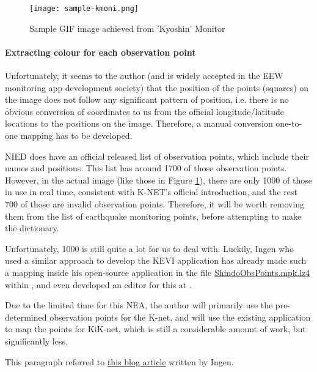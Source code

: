 \begin{figure}[!ht]
    \centering
    \texttt{[image: sample-kmoni.png]}
    \caption{Sample GIF image achieved from 'Kyoshin' Monitor}
    \label{fig:sample-kmoni}
\end{figure}

\paragraph{Extracting colour for each observation point}

Unfortunately, it seems to the author (and is widely accepted in the EEW monitoring app development society) that the position of the points (squares) on the image does not follow any significant pattern of position, i.e. there is no obvious conversion of coordinates to us from the official longitude/latitude locations to the positions on the image. Therefore, a manual conversion one-to-one mapping has to be developed.

NIED does have an official released list of observation points, which include their names and positions. This list has around 1700 of those observation points. However, in the actual image (like those in Figure \ref{fig:sample-kmoni}), there are only 1000 of those in use in real time, consistent with K-NET's official introduction, and the rest 700 of those are invalid observation points. Therefore, it will be worth removing them from the list of earthquake monitoring points, before attempting to make the dictionary.

Unfortunately, 1000 is still quite a lot for us to deal with. Luckily, Ingen who used a similar approach to develop the KEVI application has already made such a mapping inside his open-source application in the file \href{https://github.com/ingen084/KyoshinEewViewerIngen/blob/develop/src/KyoshinEewViewer/Assets/ShindoObsPoints.mpk.lz4}{ShindoObsPoints.mpk.lz4} within , and even developed an editor for this at .

Due to the limited time for this NEA, the author will primarily use the pre-determined observation points for the K-net, and will use the existing application to map the points for KiK-net, which is still a considerable amount of work, but significantly less.

This paragraph referred to \href{https://qiita.com/ingen084/items/7e91f8da2996972ac586}{this blog article} written by Ingen.

